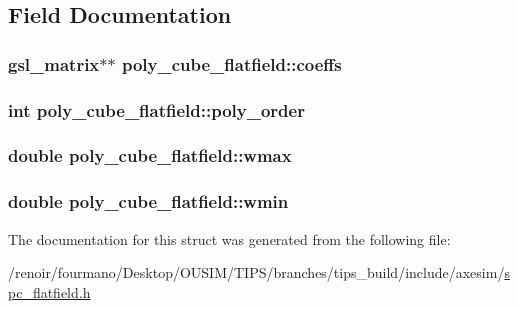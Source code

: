 \subsection{Field Documentation}
\hypertarget{structpoly__cube__flatfield_a5e941be5d850641c8f11e35e48d9266e}{
\subsubsection[{coeffs}]{\setlength{\rightskip}{0pt plus 5cm}gsl\_\-matrix$\ast$$\ast$ {\bf poly\_\-cube\_\-flatfield::coeffs}}}
\label{structpoly__cube__flatfield_a5e941be5d850641c8f11e35e48d9266e}
\hypertarget{structpoly__cube__flatfield_a43ded1d19ab5c7a6d34ffc75788e6fdf}{
\subsubsection[{poly\_\-order}]{\setlength{\rightskip}{0pt plus 5cm}int {\bf poly\_\-cube\_\-flatfield::poly\_\-order}}}
\label{structpoly__cube__flatfield_a43ded1d19ab5c7a6d34ffc75788e6fdf}
\hypertarget{structpoly__cube__flatfield_a84506df8267a17616949e9f34424dd62}{
\subsubsection[{wmax}]{\setlength{\rightskip}{0pt plus 5cm}double {\bf poly\_\-cube\_\-flatfield::wmax}}}
\label{structpoly__cube__flatfield_a84506df8267a17616949e9f34424dd62}
\hypertarget{structpoly__cube__flatfield_a1ffb6722301a4c505bf12fa1b465ba40}{
\subsubsection[{wmin}]{\setlength{\rightskip}{0pt plus 5cm}double {\bf poly\_\-cube\_\-flatfield::wmin}}}
\label{structpoly__cube__flatfield_a1ffb6722301a4c505bf12fa1b465ba40}


The documentation for this struct was generated from the following file:\begin{DoxyCompactItemize}
\item 
/renoir/fourmano/Desktop/OUSIM/TIPS/branches/tips\_\-build/include/axesim/\hyperlink{spc__flatfield_8h}{spc\_\-flatfield.h}\end{DoxyCompactItemize}
